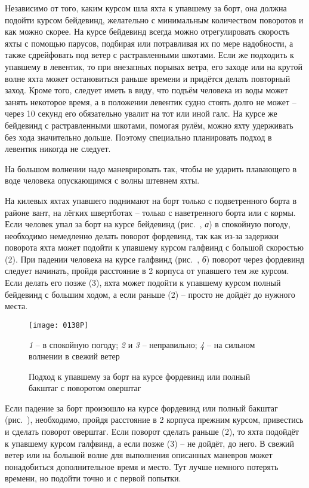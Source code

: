 Независимо от того, каким курсом шла яхта к упавшему за борт, она
должна подойти курсом бейдевинд, желательно с минимальным количеством
поворотов и как можно скорее. На курсе бейдевинд всегда можно
отрегулировать скорость яхты с помощью парусов, подбирая или
потравливая их по мере надобности, а также сдрейфовать под ветер с
растравленными шкотами. Если же подходить к упавшему в левентик, то
при внезапных порывах ветра, его заходе или на крутой волне яхта может
остановиться раньше времени и придётся делать повторный заход. Кроме
того, следует иметь в виду, что подъём человека из воды может занять
некоторое время, а в положении левентик судно стоять долго не может
\--- через 10 секунд его обязательно увалит на тот или иной
галс. На курсе же бейдевинд с растравленными шкотами, помогая рулём,
можно яхту удерживать без хода значительно дольше. Поэтому специально
планировать подход в левентик никогда не следует.

На большом волнении надо маневрировать так, чтобы не ударить
плавающего в воде человека опускающимся с волны штевнем яхты.

На килевых яхтах упавшего поднимают на борт только с подветренного
борта в районе вант, на лёгких швертботах \--- только с наветренного
борта или с кормы. Если человек упал за борт на курсе бейдевинд
(рис.~, \textit{а}) в спокойную погоду, необходимо немедленно
делать поворот фордевинд, так как из-за задержки поворота яхта может
подойти к упавшему курсом галфвинд с большой скоростью (2). При
падении человека на курсе галфвинд (рис.~, \textit{б})
поворот через фордевинд следует начинать, пройдя расстояние в 2
корпуса от упавшего тем же курсом. Если делать его позже (3), яхта
может подойти к упавшему курсом полный бейдевинд с большим ходом, а
если раньше (2) \--- просто не дойдёт до нужного места.

\begin{figure}[!htb]
  \centering{}
  \texttt{[image: 0138P]}
  \caption{Подход к упавшему за борт на курсе фордевинд или полный бакштаг с поворотом оверштаг}
  \label{fig:138}
  \small
  \centering{}
  \textit{1} \--- в спокойную погоду; \textit{2} и \textit{3} \--- неправильно; \textit{4} \--- на сильном волнении в свежий ветер
\end{figure}

Если падение за борт произошло на курсе фордевинд или полный бакштаг
(рис.~), необходимо, пройдя расстояние в 2 корпуса
прежним курсом, привестись и сделать поворот оверштаг. Если поворот
сделать раньше (2), то яхта подойдёт к упавшему курсом галфвинд, а
если позже (3) \--- не дойдёт, до него. В свежий ветер или на большой
волне для выполнения описанных маневров может понадобиться
дополнительное время и место. Тут лучше немного потерять времени, но
подойти точно и с первой попытки.

